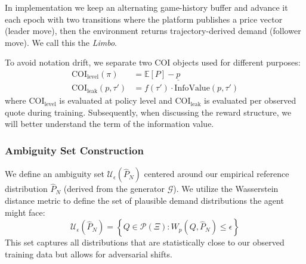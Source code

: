 In implementation we keep an alternating game-history buffer and advance it each epoch with two transitions where the platform publishes a price vector (leader move), then the environment returns trajectory-derived demand (follower move). We call this the \textit{Limbo}.

To avoid notation drift, we separate two COI objects used for different purposes:
\begin{align}
\text{COI}_{\text{level}}(\pi) &= \mathbb{E}[P]-\underline{p}\\
\text{COI}_{\text{leak}}(p,\tau') &= f(\tau')\cdot \text{InfoValue}(p,\tau')
\end{align}
where $\text{COI}_{\text{level}}$ is evaluated at policy level and $\text{COI}_{\text{leak}}$ is evaluated per observed quote during training. Subsequently, when discussing the reward structure, we will better understand the term of the information value.


\subsubsection{Ambiguity Set Construction}
We define an ambiguity set $\mathcal{U}_\epsilon(\hat{P}_N)$ centered around our empirical reference distribution $\hat{P}_N$ (derived from the generator $\mathcal{G}$). We utilize the Wasserstein distance metric to define the set of plausible demand distributions the agent might face:
\begin{equation}
\mathcal{U}_\epsilon(\hat{P}_N) = \left\{ Q \in \mathcal{P}(\Xi) : W_p(Q, \hat{P}_N) \le \epsilon \right\}
\end{equation}
This set captures all distributions that are statistically close to our observed training data but allows for adversarial shifts.

